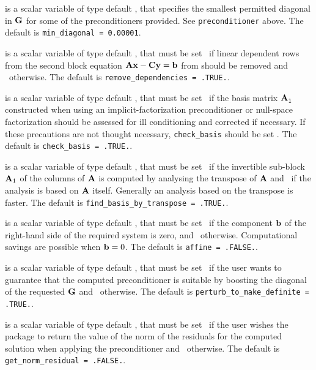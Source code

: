 \documentclass{galahad}
\begin{document}
\begin{description}


 is a scalar variable of type default \realdp, 
that specifies the smallest permitted diagonal in ${\mathbf{G}}$ for some
of the preconditioners provided. See {\tt preconditioner} above.
The default is {\tt min\_diagonal = 0.00001}.

 is a scalar variable of type default \logical, 
that must be set \true\ if linear dependent rows from the second
block equation ${\mathbf{A}} {\mathbf{x}} - {\mathbf{C}} {\mathbf{y}} = {\mathbf{b}}$ from 
should be removed and \false\ otherwise.
The default is {\tt remove\_dependencies = .TRUE.}.

 is a scalar variable of type default \logical, 
that must be set \true\ if the basis matrix ${\mathbf{A}}_{1}^{}$ constructed
when using an implicit-factorization preconditioner or null-space factorization 
should be assessed for ill conditioning and corrected if necessary. If these 
precautions are not thought necessary, {\tt check\_basis} should be
set \false. The default is {\tt check\_basis = .TRUE.}.

 is a scalar variable of type default \logical, 
that must be set \true\ if the invertible sub-block ${\mathbf{A}}_1$ of the 
columns of ${\mathbf{A}}$ is computed by analysing the transpose of ${\mathbf{A}}$ 
and \false\ if the analysis is based on ${\mathbf{A}}$ itself. Generally
an analysis based on the transpose is faster.
The default is {\tt find\_basis\_by\_transpose = .TRUE.}.

 is a scalar variable of type default \logical, 
that must be set \true\ if the component ${\mathbf{b}}$ of the right-hand side 
of the required system  is zero, and \false\ otherwise. 
Computational savings are possible when ${\mathbf{b}} = 0$. 
The default is {\tt affine = .FALSE.}.

 is a scalar variable of type default \logical, 
that must be set \true\ if the user wants to guarantee that the 
computed preconditioner is suitable by boosting the diagonal of the
requested ${\mathbf{G}}$ and \false\ otherwise.
The default is {\tt perturb\_to\_make\_definite = .TRUE.}.

 is a scalar variable of type default \logical, 
that must be set \true\ if the user wishes the package to return
the value of the norm of the residuals for the computed solution
when applying the preconditioner and  \false\ otherwise.
The default is {\tt get\_norm\_residual = .FALSE.}.


\end{description}
\end{document}
